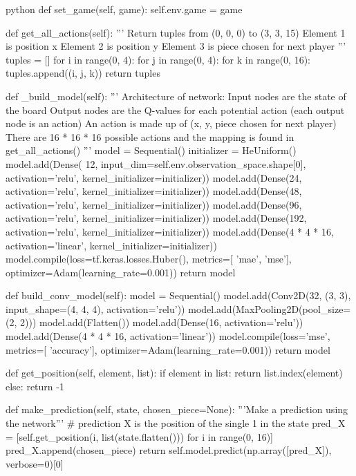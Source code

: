 \begin{mintedbox}{python}
    def set_game(self, game):
        self.env.game = game

    def get_all_actions(self):
        '''
        Return tuples from (0, 0, 0) to (3, 3, 15)
        Element 1 is position x
        Element 2 is position y
        Element 3 is piece chosen for next player
        '''
        tuples = []
        for i in range(0, 4):
            for j in range(0, 4):
                for k in range(0, 16):
                    tuples.append((i, j, k))
        return tuples

    def _build_model(self):
        '''
        Architecture of network:
        Input nodes are the state of the board
        Output nodes are the Q-values for each potential action (each output node is an action)
        An action is made up of (x, y, piece chosen for next player)
        There are 16 * 16 * 16 possible actions and the mapping is found in get_all_actions()
        '''
        model = Sequential()
        initializer = HeUniform()
        model.add(Dense(
            12, input_dim=self.env.observation_space.shape[0], activation='relu', kernel_initializer=initializer))
        model.add(Dense(24, activation='relu', kernel_initializer=initializer))
        model.add(Dense(48, activation='relu', kernel_initializer=initializer))
        model.add(Dense(96, activation='relu', kernel_initializer=initializer))
        model.add(Dense(192, activation='relu',
                    kernel_initializer=initializer))
        model.add(Dense(4 * 4 * 16, activation='linear',
                    kernel_initializer=initializer))
        model.compile(loss=tf.keras.losses.Huber(), metrics=[
                        'mae', 'mse'], optimizer=Adam(learning_rate=0.001))
        return model

    def build_conv_model(self):
        model = Sequential()
        model.add(Conv2D(32, (3, 3), input_shape=(4, 4, 4), activation='relu'))
        model.add(MaxPooling2D(pool_size=(2, 2)))
        model.add(Flatten())
        model.add(Dense(16, activation='relu'))
        model.add(Dense(4 * 4 * 16, activation='linear'))
        model.compile(loss='mse', metrics=[
                        'accuracy'], optimizer=Adam(learning_rate=0.001))
        return model

    def get_position(self, element, list):
        if element in list:
            return list.index(element)
        else:
            return -1

    def make_prediction(self, state, chosen_piece=None):
        '''Make a prediction using the network'''
        # prediction X is the position of the single 1 in the state
        pred_X = [self.get_position(i, list(state.flatten()))
                    for i in range(0, 16)]
        pred_X.append(chosen_piece)
        return self.model.predict(np.array([pred_X]), verbose=0)[0]


\end{mintedbox}
